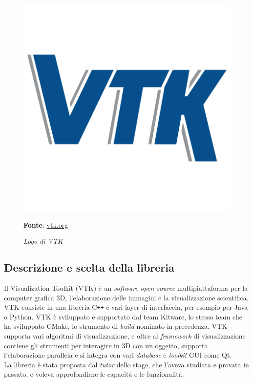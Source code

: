 \begin{figure}[h]
    \centering
    \includegraphics[scale=0.1]{immagini/volumerendering/VTK_logo.png}
    \caption{\textit{Logo di VTK}}
    \textbf{Fonte}: \href{https://vtk.org/}{vtk.org}
    \label{fig: Logo VTK}
\end{figure}

\subsection{Descrizione e scelta della libreria}\label{sec:scelta-liberia}
Il Visualization Toolkit (VTK) è un \emph{software} \emph{open-source} multipiattaforma per la computer grafica 3D, l'elaborazione delle immagini e la visualizzazione scientifica. VTK consiste in una libreria C\texttt{++} e vari layer di interfaccia, per esempio per Java o Python. VTK è sviluppato e supportato dal team Kitware, lo stesso team che ha sviluppato CMake, lo strumento di \emph{build} nominato in precedenza. VTK supporta vari algoritmi di visualizzazione, e oltre al \emph{framework} di visualizzazione contiene gli strumenti per interagire in 3D con un oggetto, supporta l'elaborazione parallela e si integra con vari \emph{database} e \emph{toolkit} GUI come Qt.
\\
La libreria è stata proposta dal \emph{tutor} dello stage, che l'aveva studiata e provata in passato, e voleva approfondirne le capacità e le funzionalità.

